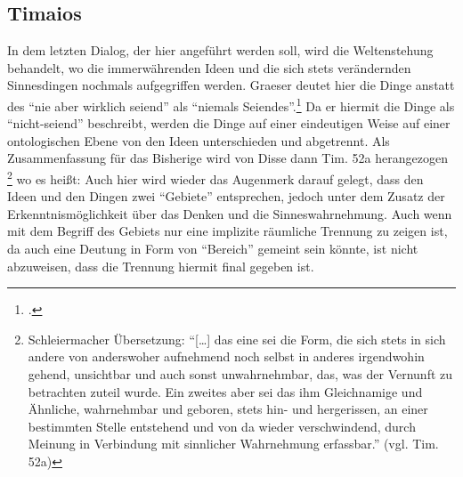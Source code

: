 \subsection{Timaios}
In dem letzten Dialog, der hier angeführt werden soll, wird die Weltenstehung behandelt, wo die immerwährenden Ideen und die sich stets verändernden Sinnesdingen nochmals aufgegriffen werden. 
 Graeser deutet hier die Dinge anstatt des \enquote{nie aber wirklich seiend} als \enquote{niemals Seiendes}.\footcite[vgl.][S. 140]{GraeserPhiloGeschichte} Da er hiermit die Dinge als \enquote{nicht-seiend} beschreibt, werden die Dinge auf einer eindeutigen Weise auf einer ontologischen Ebene von den Ideen unterschieden und abgetrennt.
Als Zusammenfassung für das Bisherige wird von Disse dann Tim. 52a herangezogen
\footnote{Schleiermacher Übersetzung: \enquote{[\dots] das eine sei die Form, die sich stets in sich andere von anderswoher aufnehmend noch selbst in anderes irgendwohin gehend, unsichtbar und auch sonst unwahrnehmbar, das, was der Vernunft zu betrachten zuteil wurde. Ein zweites aber sei das ihm Gleichnamige und Ähnliche, wahrnehmbar und geboren, stets hin- und hergerissen, an einer bestimmten Stelle entstehend und von da wieder verschwindend, durch Meinung in Verbindung mit sinnlicher Wahrnehmung erfassbar.} (vgl. Tim. 52a)} 
wo es heißt:
Auch hier wird wieder das Augenmerk darauf gelegt, dass den Ideen und den Dingen zwei \enquote{Gebiete} entsprechen, jedoch unter dem Zusatz der Erkenntnismöglichkeit über das Denken und die Sinneswahrnehmung. Auch wenn mit dem Begriff des Gebiets nur eine implizite räumliche Trennung zu zeigen ist, da auch eine Deutung in Form von \enquote{Bereich} gemeint sein könnte, ist nicht abzuweisen, dass die Trennung hiermit final gegeben ist.


